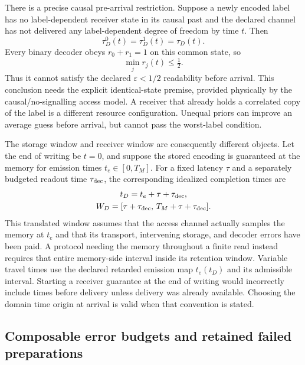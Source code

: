 There is a precise causal pre-arrival restriction. Suppose a newly encoded
label has no label-dependent receiver state in its causal past and the
declared channel has not delivered any label-dependent degree of freedom
by time $t$. Then
\begin{equation}
 \tau_D^0(t)=\tau_D^1(t)=\tau_D(t).
 \label{eq:chvif-before-arrival-states}
\end{equation}
Every binary decoder obeys $r_0+r_1=1$ on this common state, so
\begin{equation}
 \min_j r_j(t)\leq\tfrac12.
 \label{eq:chvif-before-arrival-no-record}
\end{equation}
Thus it cannot satisfy the declared $\varepsilon<1/2$ readability before
arrival. This conclusion needs the explicit identical-state premise,
provided physically by the causal/no-signalling access model. A receiver
that already holds a correlated copy of the label is a different resource
configuration. Unequal priors can improve an average guess before arrival,
but cannot pass the worst-label condition.

The storage window and receiver window are consequently different objects.
Let the end of writing be $t=0$, and suppose the stored encoding is
guaranteed at the memory for emission times $t_e\in[0,T_M]$. For a fixed
latency $\tau$ and a separately budgeted readout time $\tau_{\rm dec}$,
the corresponding idealized completion times are
\begin{equation}
\begin{gathered}
t_D=t_e+\tau+\tau_{\rm dec},\\
 W_D=[\tau+\tau_{\rm dec},\,
                         T_M+\tau+\tau_{\rm dec}].
\end{gathered}
\label{eq:chvif-memory-receiver-windows}
\end{equation}
This translated window assumes that the access channel actually samples
the memory at $t_e$ and that its transport, intervening storage, and decoder
errors have been paid. A protocol needing the memory throughout a finite
read instead requires that entire memory-side interval inside its retention
window. Variable travel times use the declared retarded emission map
$t_e(t_D)$ and its admissible interval. Starting a receiver guarantee at
the end of writing would incorrectly include times before delivery unless
delivery was already available. Choosing the domain time origin at
arrival is valid when that convention is stated.

\subsection{Composable error budgets and retained failed preparations}
\label{sec:chvif-record-composition}

